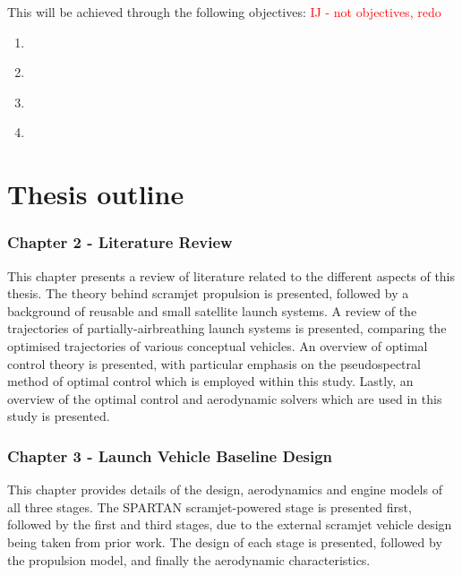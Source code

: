     \noindent This will be achieved through the following objectives:
 \textcolor{red}{IJ - not objectives, redo}
    \begin{enumerate}
    	 \item \emph{}\\


\item \emph{}\\

    	
      \item \emph{}\\


      \item \emph{}\\



    \end{enumerate}

  \clearpage
  \section{Thesis outline}

    

    \subsubsection*{Chapter 2 - Literature Review}

      This chapter presents a review of literature related to the different aspects of this thesis. The theory behind scramjet propulsion is presented, followed by a background of reusable and small satellite launch systems. A review of the trajectories of partially-airbreathing launch systems is presented, comparing the optimised trajectories of various conceptual vehicles. An overview of optimal control theory is presented, with particular emphasis on the pseudospectral method of optimal control which is employed within this study. Lastly, an overview of the optimal control and aerodynamic solvers which are used in this study is presented.
      

    \subsubsection*{Chapter 3 - Launch Vehicle Baseline Design}

      This chapter provides details of the design, aerodynamics and engine models of all three stages. The SPARTAN scramjet-powered stage is presented first, followed by the first and third stages, due to the external scramjet vehicle design being taken from prior work. The design of each stage is presented, followed by the propulsion model, and finally the aerodynamic characteristics. 
      
